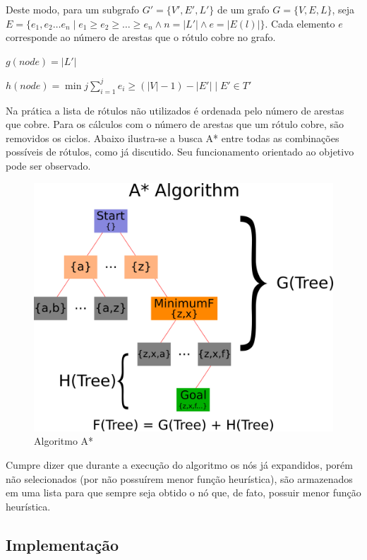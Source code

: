 \documentclass[12pt]{article}
\begin{document}
		Deste modo, para um subgrafo $G' = \{V', E', L'\}$ de um grafo $G = \{V, E, L\}$, seja $E = \{e_1, e_2 \dots e_n \mid e_1 \geq e_2 \geq \dots \geq e_n \wedge n = |L'| \wedge e = |E(l)|\}$. Cada elemento $e$ corresponde ao número de arestas que o rótulo cobre no grafo.

		$g(node) = |L'|$

		$h(node) = \displaystyle{\min j \sum_{i = 1}^{j}{e_i} \geq (|V| - 1) - |E'| \mid E' \in T'}$

		Na prática a lista de rótulos não utilizados é ordenada pelo número de arestas que cobre. Para os cálculos com o número de arestas que um rótulo cobre, são removidos os ciclos. Abaixo ilustra-se a busca A* entre todas as combinações possíveis de rótulos, como já discutido. Seu funcionamento orientado ao objetivo pode ser observado.

		\begin{center}
		\begin{figure}[H]
		\includegraphics[width=1\textwidth]{aestrela.png}
		\caption{Algoritmo A*}
		\label{fig:aestrela}
		\end{figure}
		\end{center}

		Cumpre dizer que durante a execução do algoritmo os nós já expandidos, porém não selecionados (por não possuírem menor função heurística), são armazenados em uma lista para que sempre seja obtido o nó que, de fato, possuir menor função heurística.

	\subsection{Implementação}\label{sec:implementacao}
\end{document}
